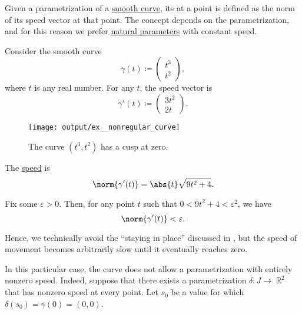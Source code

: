 \begin{definition}\label{def:curve_speed}
  Given a parametrization of a \hyperref[def:smooth_curve]{smooth curve}, its  at a point is defined as the norm of its speed vector at that point. The concept depends on the parametrization, and for this reason we prefer \hyperref[thm:natural_parametrization_existence]{natural parameters} with constant speed.
\end{definition}

\begin{example}\label{ex:nonregular_curve}
  Consider the smooth curve
  \begin{equation*}
    \gamma(t)
    \coloneqq
    \begin{pmatrix}
      t^3 \\ t^2
    \end{pmatrix},
  \end{equation*}
  where \( t \) is any real number. For any \( t \), the speed vector is
  \begin{equation*}
    \gamma'(t)
    \coloneqq
    \begin{pmatrix}
      3t^2 \\ 2t
    \end{pmatrix}.
  \end{equation*}

  \begin{figure}[!ht]
    \centering
    \texttt{[image: output/ex\_\_nonregular\_curve]}
    \caption{The curve \( (t^3, t^2) \) has a cusp at zero.}\label{fig:ex:nonregular_curve}
  \end{figure}

  The \hyperref[def:curve_speed]{speed} is
  \begin{equation*}
    \norm{\gamma'(t)} = \abs{t} \sqrt{9 t^2 + 4}.
  \end{equation*}

  Fix some \( \varepsilon > 0 \). Then, for any point \( t \) such that \( 0 < 9 t^2 + 4 < \varepsilon^2 \), we have
  \begin{equation*}
    \norm{\gamma'(t)} < \varepsilon.
  \end{equation*}

  Hence, we technically avoid the \enquote{staying in place} discussed in , but the speed of movement becomes arbitrarily slow until it eventually reaches zero.

  In this particular case, the curve does not allow a parametrization with entirely nonzero speed. Indeed, suppose that there exists a parametrization \( \delta: J \to \BbbR^2 \) that has nonzero speed at every point. Let \( s_0 \) be a value for which \( \delta(s_0) = \gamma(0) = (0, 0) \).


\end{example}

